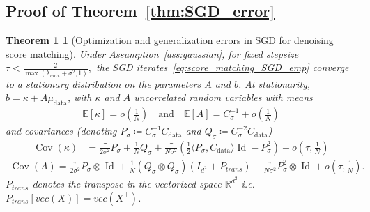 \documentclass[11pt]{article}
\newcommand{\eqdef}{\coloneqq}
\newcommand{\id}{\operatorname{Id}}
\newcommand{\RR}{\mathbb{R}}
\newcommand{\EE}{\mathbb{E}}
\newcommand{\cov}{\operatorname{Cov}}
\begin{document}
\subsection{Proof of Theorem~\ref{thm:SGD_error}} 
\label{app:SGD}
\newtheorem*{repeatthm1}{Theorem 1}
\begin{repeatthm1}[Optimization and generalization errors in SGD for denoising score matching] 
Under Assumption~\ref{ass:gaussian}, for fixed stepsize $\tau < \frac{2}{\max\left( \lambda_{max} + \sigma^2, 1 \right)},$ the SGD iterates~\eqref{eq:score_matching_SGD_emp} converge to a stationary distribution on the parameters $A$ and $b$. At stationarity, $b = \kappa + A \mu_\mathrm{data}$, with $\kappa$ and $A$ uncorrelated random variables with means
\begin{align*}
 \EE[\kappa] =  o\left( \frac{1}{N}\right)\quad\text{and}\quad \EE[A] = C_\sigma^{-1} + o\left( \frac{1}{N}\right)
\end{align*}
and covariances (denoting $P_\sigma \eqdef C_\sigma^{-1} C_\mathrm{data}$ and $Q_\sigma \eqdef C_\sigma^{-2}C_\mathrm{data}$)
\begin{equation*}
\begin{split}
\cov(\kappa) &= \frac{\tau}{2 \sigma^2} P_\sigma +  \frac{1}{N} Q_\sigma + \frac{\tau}{N \sigma^2} \left( \frac12 \langle P_\sigma, C_\mathrm{data} \rangle \id -  P_\sigma^2 \right) 
+ o \left(\tau, \frac{1}{N}\right) 
\end{split}
\end{equation*}
\begin{equation*}
\begin{split}
\cov(A)  = \frac{\tau}{2\sigma^2} P_\sigma \otimes \id + \frac{1}{N} \left( Q_\sigma \otimes Q_\sigma \right) (I_{d^2} + P_{trans})  -  \frac{\tau}{N \sigma^2} P_\sigma^2 \otimes \id  + o\left(\tau, \frac{1}{N}\right) .
\end{split}
\end{equation*}
$P_{trans}$ denotes the transpose in the vectorized space $\RR^{d^2}$  i.e. $P_{trans}[vec(X)] = vec(X^\top)$.
\end{repeatthm1}
\end{document}
